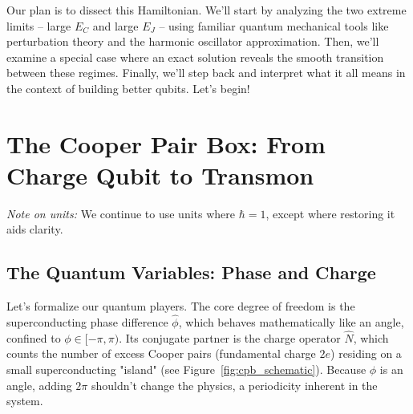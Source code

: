 \documentclass{book}
\begin{document}
Our plan is to dissect this Hamiltonian. We'll start by analyzing the two extreme limits – large \(E_C\) and large \(E_J\) – using familiar quantum mechanical tools like perturbation theory and the harmonic oscillator approximation. Then, we'll examine a special case where an exact solution reveals the smooth transition between these regimes. Finally, we'll step back and interpret what it all means in the context of building better qubits. Let's begin!



\chapter{The Cooper Pair Box: From Charge Qubit to Transmon}
\label{chap:cpb}


\noindent\textit{Note on units:} We continue to use units where \(\hbar = 1\), except where restoring it aids clarity.


\section{The Quantum Variables: Phase and Charge}
\label{sec:intro} %

Let's formalize our quantum players. The core degree of freedom is the superconducting phase difference \(\hat{\phi}\), which behaves mathematically like an angle, confined to \(\phi \in [-\pi, \pi)\). Its conjugate partner is the charge operator \(\hat{N}\), which counts the number of excess Cooper pairs (fundamental charge \(2e\)) residing on a small superconducting "island" (see Figure~\ref{fig:cpb_schematic}). Because \(\phi\) is an angle, adding \(2\pi\) shouldn't change the physics, a periodicity inherent in the system.
\end{document}
